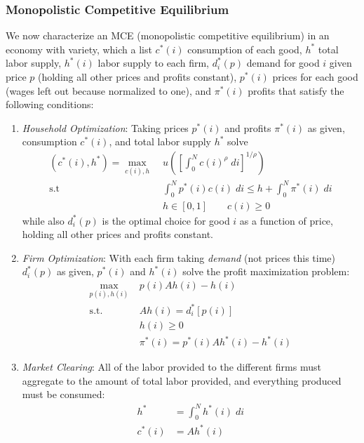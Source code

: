 \documentclass[12pt]{article}
\theoremstyle{plain}
\theoremstyle{definition}
\theoremstyle{remark}
\newcommand{\intzN}{\int_0^N}
\begin{document}
\clearpage
\subsubsection{Monopolistic Competitive Equilibrium}

We now characterize an MCE (monopolistic competitive equilibrium) in an
economy with variety, which a list $c^*(i)$ consumption of
each good, $h^*$ total labor supply, $h^*(i)$ labor supply to each firm,
$d^*_i(p)$ demand for good $i$ given price $p$ (holding all other prices
and profits constant), $p^*(i)$ prices for each good (wages left out
because normalized to one), and $\pi^*(i)$ profits that satisfy the
following conditions:
\begin{enumerate}
  \item \emph{Household Optimization}: Taking prices $p^*(i)$ and
    profits $\pi^*(i)$ as given, consumption $c^*(i)$, and total labor
    supply $h^*$ solve
    \begin{align*}
      (c^*(i), h^*)
      = \max_{c(i), h}
        & \; u\left(
          \left[ \int_0^N c(i)^\rho \; di \right]^{1/\rho}
        \right)\\
      \text{s.t} & \;
        \intzN p^*(i) c(i) \; di \leq h
          + \intzN \pi^*(i) \; di \\
      &\; h\in[0,1]
      \qquad c(i) \geq 0
    \end{align*}
    while also $d^*_i(p)$ is the optimal choice for good $i$ as a
    function of price, holding all other prices and profits constant.

  \item \emph{Firm Optimization}: With each firm taking \emph{demand}
    (not prices this time) $d_i^*(p)$ as given, $p^*(i)$ and $h^*(i)$
    solve the profit maximization problem:
    \begin{align*}
      \max_{p(i),h(i)}
      &\;
      p(i) Ah(i) - h(i) \\
      \text{s.t.} \;
      & \; Ah(i) = d_i^*[p(i)] \\
      & \; h(i) \geq 0\\
      & \; \pi^*(i) = p^*(i) Ah^*(i) - h^*(i)
    \end{align*}

  \item \emph{Market Clearing}: All of the labor provided to the
    different firms must aggregate to the amount of total labor
    provided, and everything produced must be consumed:
    \begin{align*}
       h^* &= \intzN h^*(i) \; di \\
       c^*(i) &= Ah^*(i)
    \end{align*}
\end{enumerate}
\end{document}
